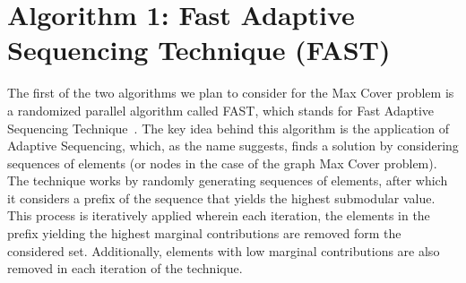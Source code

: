 \documentclass[11pt, a4paper]{article}
\begin{document}


\section{Algorithm 1: Fast Adaptive Sequencing Technique (\textsc{FAST})}
The first of the two algorithms we plan to consider for the Max Cover problem is a randomized parallel algorithm called FAST, which stands for Fast Adaptive Sequencing Technique~\cite{breuer2019fast}. The key idea behind this algorithm is the application of Adaptive Sequencing, which, as the name suggests, finds a solution by considering sequences of elements (or nodes in the case of the graph Max Cover problem). The technique works by randomly generating sequences of elements, after which it considers a prefix of the sequence that yields the highest submodular value. This process is iteratively applied wherein each iteration, the elements in the prefix yielding the highest marginal contributions are removed form the considered set. Additionally, elements with low marginal contributions are also removed in each iteration of the technique.    
\end{document}
